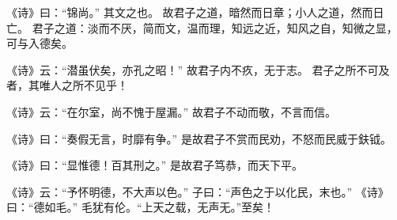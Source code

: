 \documentclass[twoside,openany]{book}
\begin{document}
\begin{pinyinscope}
《诗》曰：“锦尚。”
其文之也。
故君子之道，暗然而日章；小人之道，然而日亡。
君子之道：淡而不厌，简而文，温而理，知远之近，知风之自，知微之显，可与入德矣。

《诗》云：“潜虽伏矣，亦孔之昭！”
故君子内不疚，无于志。
君子之所不可及者，其唯人之所不见乎！

《诗》云：“在尔室，尚不愧于屋漏。”
故君子不动而敬，不言而信。

《诗》曰：“奏假无言，时靡有争。”
是故君子不赏而民劝，不怒而民威于鈇钺。

《诗》曰：“显惟德！百其刑之。”
是故君子笃恭，而天下平。

《诗》云：“予怀明德，不大声以色。”
子曰：“声色之于以化民，末也。”
《诗》曰：“德如毛。”
毛犹有伦。“上天之载，无声无。”至矣！
\end{pinyinscope}
\end{document}
